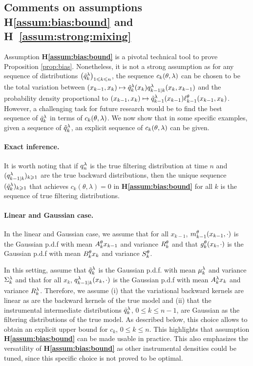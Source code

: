 \documentclass{article}
\begin{document}
\subsection{Comments on assumptions H\ref{assum:bias:bound} and H~\ref{assum:strong:mixing}}
\label{sec:assumptions}
Assumption \textbf{H\ref{assum:bias:bound}} is a pivotal technical tool to prove Proposition \ref{prop:bias}. 
Nonetheless, it is not a strong assumption as for any sequence of distributions $\left(\tilde{q}_{k}^{\lambda}\right)_{1\leqslant k \leqslant n}$, the sequence $c_k(\theta,\lambda)$ can be chosen to be the total variation between  $(x_{k-1}, x_k) \mapsto \tilde{q}_{k}^{\lambda}(x_k)q_{k-1 \vert k}^{\lambda}(x_{k}, x_{k-1})$ and the probability density proportional to
$(x_{k-1}, x_k) \mapsto \tilde{q}_{k-1}^{\lambda}(x_{k-1}) \ell_{k-1}^{\theta}(x_{k-1}, x_k)$. 
However, a challenging task for future research would be to find the best sequence of $\tilde{q}_{k}^{\lambda}$ in terms of $c_k(\theta,\lambda)$.
We now show that in some specific examples, given a sequence of $\tilde{q}_{k}^{\lambda}$, an explicit sequence of $c_k(\theta, \lambda)$ can be given.

\paragraph{Exact inference.} It is worth noting that if  $q_{n}^{\lambda}$ is the true filtering distribution at time $n$ and $(q_{k-1\vert k}^{\lambda})_{k\geqslant 1}$ are  the true backward distributions, then the unique sequence $(\tilde{q}_{k}^{\lambda})_{k\geqslant 1}$ that achieves $c_k(\theta, \lambda) = 0$ in \textbf{H\ref{assum:bias:bound}} for all $k$ is the sequence of true filtering distributions.

\paragraph{Linear and Gaussian case.}
In  the linear and Gaussian case, we assume that for all $x_{k-1}$, $m_{k-1}^{\theta}(x_{k-1}, \cdot)$ is the Gaussian p.d.f with mean $A_{k}^{\theta} x_{k-1}$ and variance $R_{k}^{\theta}$  and that $g_{k}^{\theta}(x_{k},\cdot)$ is the Gaussian p.d.f with mean $B_{k}^{\theta} x_k$ and variance $S_{k}^{\theta}$. 

In this setting, assume that $\tilde{q}_{k}^{\lambda}$ is the Gaussian p.d.f. with mean $\mu_{k}^{\lambda}$ and variance $\Sigma_{k}^{\lambda}$ and that for all $x_k$, $q_{k-1\vert k}^{\lambda}(x_{k}, \cdot)$ is the Gaussian p.d.f with mean $A_{k}^{\lambda} x_k$ and variance $R_{k}^{\lambda}$. Therefore, we assume (i) that the variational backward kernels are linear as are the backward kernels of the true model and (ii) that the instrumental intermediate distributions $\tilde{q}_{k}^{\lambda}$, $0\leq k \leq n-1$, are Gaussian as the filtering distributions of the true model. As described below, this choice allows to obtain an explicit upper bound for $c_k$, $0\leq k \leq n$. This highlights that assumption \textbf{H\ref{assum:bias:bound}} can be made usable in practice. This also emphasizes the versatility of \textbf{H\ref{assum:bias:bound}} as other instrumental densities could be tuned, since this specific choice is not proved to be optimal.
\end{document}
